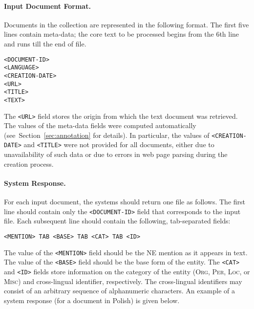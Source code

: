 \documentclass[11pt]{article}
\begin{document}
\paragraph{Input Document Format.}
\label{subsec:input}
%
Documents in the collection are represented in the following format.  The {first five
  lines} contain meta-data; the core text to be processed begins from the 6th line and runs
till the end of file.

\begin{small}
\begin{verbatim}
<DOCUMENT-ID>
<LANGUAGE>
<CREATION-DATE>
<URL>
<TITLE>
<TEXT>
\end{verbatim}
\end{small}

\noindent The \verb+<URL>+ field stores the origin from which the text document was retrieved.
The values of the meta-data fields were computed automatically
(see~Section~\ref{sec:annotation} for details). In particular, the values of
\verb+<CREATION-DATE>+ and \verb+<TITLE>+ were not provided for all documents, either due to
unavailability of such data or due to errors in web page parsing during the creation process.

\paragraph{System Response.}
\label{subsec:input}
%
For each input document, the systems should return one file as follows.  The first line should
contain only the \verb+<DOCUMENT-ID>+ field that corresponds to the input file.  Each
subsequent line should contain the following, tab-separated fields:

\begin{small}
\begin{verbatim}
<MENTION> TAB <BASE> TAB <CAT> TAB <ID>
\end{verbatim}
\end{small}

\noindent The value of the \verb+<MENTION>+ field should be the NE mention as it appears in
text.  The value of the \verb+<BASE>+ field should be the base form of the entity.  The
\verb+<CAT>+ and \verb+<ID>+ fields store information on the category of the entity
(\textsc{Org}, \textsc{Per}, \textsc{Loc}, or \textsc{Misc}) and cross-lingual identifier,
respectively.  The cross-lingual identifiers may consist of an arbitrary sequence of
alphanumeric characters.  An example of a system response (for a document in Polish) is given
below.
\end{document}
